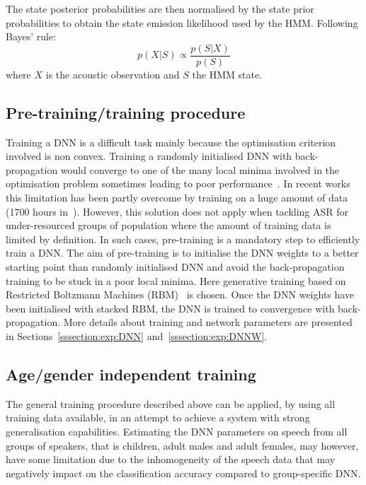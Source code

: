 \documentclass{nle}
\begin{document}
The state posterior probabilities are then normalised by the state prior probabilities to obtain the state emission likelihood used by the HMM. Following Bayes' rule:
\begin{equation}
 p(X|S)\propto \frac{p(S|X)}{p(S)} \nonumber
\end{equation}
where $X$ is the acoustic observation and $S$ the HMM state.

\subsection{Pre-training/training procedure}
Training a DNN is a difficult task mainly because the optimisation criterion involved is non convex. Training a randomly initialised DNN with back-propagation would converge to one of the many local minima involved in the optimisation problem sometimes leading to poor performance~\citep{erhan10}. In recent works this limitation has been partly overcome by training on a huge amount of data (1700 hours in~\citet{42536}). However, this solution does not apply when tackling ASR for under-resourced groups of population where the amount of training data is limited by definition. In such cases, pre-training is a mandatory step to efficiently train a DNN. The aim of pre-training is to initialise the DNN weights to a better starting point than randomly initialised DNN and avoid the back-propagation training to be stuck in a poor local minima. Here generative training based on Restricted Boltzmann Machines (RBM)~\citep{hinton06,erhan10} is chosen. Once the DNN weights have been initialised with stacked RBM, the DNN is trained to convergence with back-propagation. More details about training and network parameters are presented in Sections~\ref{sssection:exp:DNN} and~\ref{sssection:exp:DNNW}.

\subsection{Age/gender independent training} 
The general training procedure described above can be applied, by using
all training data available, in an attempt to  achieve   a  system  with   strong  generalisation  capabilities.
Estimating the DNN  parameters on speech from all  groups of speakers,
that is  children, adult  males and adult  females, may however, have
some limitation due to the  inhomogeneity of the speech data that may
negatively   impact  on  the   classification  accuracy   compared  to
group-specific DNN.
\end{document}
